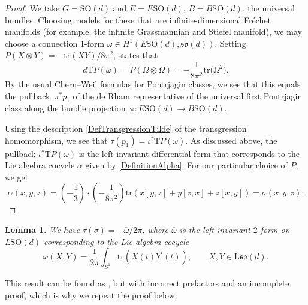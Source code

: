 \documentclass[10pt,a4paper]{amsart}
\numberwithin{equation}{section}
\newtheorem{Lemma}[Theorem]{Lemma}
\newcommand{\tr}{\mathrm{tr}}
\newcommand{\SO}{\mathrm{SO}}
\renewcommand{\L}{\mathrm{L}}
\begin{document}
\begin{proof}
We take $G = \SO(d)$ and $E = E\SO(d)$, $B = B\SO(d)$, the universal bundles.
Choosing models for these that are infinite-dimensional Fr\'echet manifolds (for example, the infinite Grassmannian and Stiefel manifold), we may choose a connection 1-form $\omega \in H^1(E\SO(d), \mathfrak{so}(d))$.
Setting $P(X \otimes Y) = -\tr(XY)/8\pi^2$, \cite[Proposition~3.2]{ChernSimons} states that
\begin{equation*}
 d \mathrm{T}P(\omega) = P(\Omega \otimes \Omega) = -\frac{1}{8\pi^2}\tr\big(\Omega^2\big).
\end{equation*}
By the usual Chern--Weil formulas for Pontrjagin classes, we see that this equals the pullback~$\pi^*p_1$ of the de Rham representative of the universal first Pontrjagin class along the bundle projection~$\pi\colon E\SO(d) \to B\SO(d)$.

Using the description \eqref{DefTransgressionTilde} of the transgression homomorphism, we see that $\tilde{\tau}(p_1) = \iota^*\mathrm{T}P(\omega)$.
As discussed above, the pullback $\iota^*\mathrm{T}P(\omega)$ is the left invariant differential form that corresponds to the Lie algebra cocycle $\alpha$ given by \eqref{DefinitionAlpha}.
For our particular choice of $P$, we get
\[
\alpha(x, y, z) = \left(-\frac{1}{3}\right) \cdot\left(-\frac{1}{8\pi^2}\right) \tr(x [y, z] + y [z, x] + z [x, y])
= \sigma(x, y, z).\tag*{\qed}
\]\renewcommand{\qed}{}
\end{proof}



\begin{Lemma}
\label{LemmaA3}
We have $\tau(\overline{\sigma}) = -\overline{\omega}/2 \pi$, where $\overline{\omega}$ is the left-invariant $2$-form on $L\SO(d)$ corresponding to the Lie algebra cocycle
\begin{equation*}
 \omega(X, Y) = \frac{1}{2\pi}\int_{S^1} \tr(X(t)Y^\prime(t)), \qquad X, Y \in \L\mathfrak{so}(d).	
\end{equation*}
\end{Lemma}

This result can be found as \cite[Proposition~4.4.4]{PressleySegal}, but with incorrect prefactors and an incomplete proof, which is why we repeat the proof below.
\end{document}
